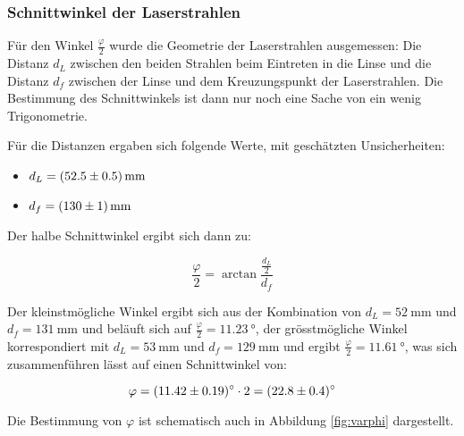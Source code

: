 \subsubsection{Schnittwinkel der Laserstrahlen}
\label{subsubsec:varphi}

\begin{minipage}[t]{\textwidth}
    \centering
    \resizebox{.75\textwidth}{!}{}
    \label{fig:varphi}
\end{minipage}

F\"ur  den Winkel  $\frac{\varphi}{2}$ wurde  die Geometrie  der Laserstrahlen
ausgemessen: Die Distanz $d_L$ zwischen den  beiden Strahlen beim Eintreten in
die Linse und die Distanz $d_f$  zwischen der Linse und dem Kreuzungspunkt der
Laserstrahlen. Die Bestimmung des Schnittwinkels ist  dann nur noch eine Sache
von ein wenig Trigonometrie.

F\"ur   die  Distanzen   ergaben  sich   folgende  Werte,   mit  gesch\"atzten
Unsicherheiten:

\begin{itemize}
    \item
        $ d_L = \SI{52.5 \pm 0.5}{\milli\meter}$
    \item
        $ d_f = \SI{130 \pm 1}{\milli\meter}$
\end{itemize}

Der halbe Schnittwinkel ergibt sich dann zu:

\begin{equation}
    \label{eq:varphi_half}
    \frac{\varphi}{2} = \arctan \frac{\frac{d_L}{2}}{d_f}
\end{equation}

Der kleinstm\"ogliche Winkel ergibt sich aus der Kombination von
$d_L = \SI{52}{\milli\meter}$
und
$d_f = \SI{131}{\milli\meter}$
und
bel\"auft sich auf
$\frac{\varphi}{2} = \SI{11.23}{\degree}$,
der gr\"osstm\"ogliche Winkel korrespondiert mit
$d_L = \SI{53}{\milli\meter}$
und
$d_f = \SI{129}{\milli\meter}$
und ergibt
$\frac{\varphi}{2} = \SI{11.61}{\degree}$,
was sich zusammenf\"uhren l\"asst auf einen Schnittwinkel von:

\begin{equation}
    \label{eq:varphi_result}
    \varphi = \SI{11.42 \pm 0.19}{\degree} \cdot 2 = \SI{22.8 \pm 0.4}{\degree}
\end{equation}

Die   Bestimmung   von   $\varphi$   ist   schematisch   auch   in   Abbildung
\ref{fig:varphi} dargestellt.
